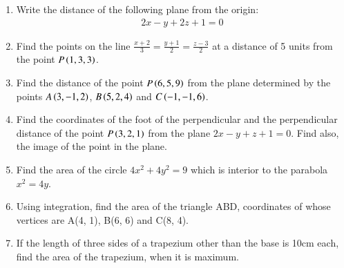 \begin{enumerate}

\item Write the distance of the following plane from the origin:
    \begin{align*}
    2x - y + 2z + 1 = 0
    \end{align*}

\item Find the points on the line $\frac{x+2}{3} = \frac{y+1}{2} = \frac{z-3}{2}$ at a distance of 5 units from the point $P\left(1, 3, 3\right)$.

\item Find the distance of the point $P\left(6, 5, 9\right)$ from the plane determined by the points $A\left(3, -1, 2\right)$, $B\left(5, 2, 4\right)$ and $C\left(-1, -1, 6\right)$.

\item Find the coordinates of the foot of the perpendicular and the perpendicular distance of the point $P\left(3, 2, 1\right)$ from the plane $2x - y + z + 1 = 0$. Find also, the image of the point in the plane.

\item Find the area of the circle $4x^2 + 4y^2 = 9$ which is interior to the parabola $x^2 = 4y$.

\item Using integration, find the area of the triangle ABD, coordinates of whose vertices are A(4, 1), B(6, 6) and C(8, 4).

\item If the length of three sides of a trapezium other than the base is 10cm each, find the area of the trapezium, when it is maximum.

\end{enumerate}
